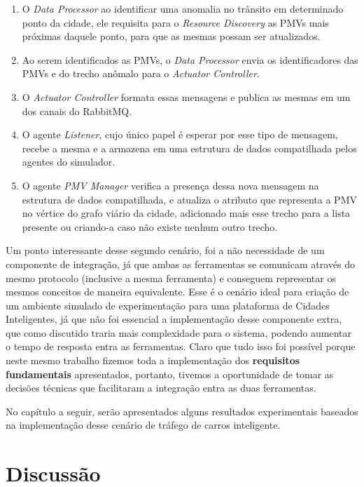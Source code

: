 \begin{enumerate}
    \item O \textit{Data Processor} ao identificar uma anomalia no trânsito em determinado ponto da cidade, ele requisita para o \textit{Resource Discovery} as PMVs mais próximas
        daquele ponto, para que as mesmas possam ser atualizados.

    \item Ao serem identificados as PMVs, o \textit{Data Processor} envia os identificadores das PMVs e do trecho anômalo para o \textit{Actuator Controller}.

    \item O \textit{Actuator Controller} formata essas mensagens e publica as mesmas em um dos canais do RabbitMQ.

    \item O agente \textit{Listener}, cujo único papel é esperar por esse tipo de mensagem, recebe a mesma e a armazena em uma estrutura de dados compatilhada pelos agentes do simulador.

    \item O agente \textit{PMV Manager} verifica a presença dessa nova mensagem na estrutura de dados compatilhada, e atualiza o atributo que representa a PMV no vértice do grafo
        viário da cidade, adicionado mais esse trecho para a lista presente ou criando-a caso não existe nenhum outro trecho.
\end{enumerate}

Um ponto interessante desse segundo cenário, foi a não necessidade de um componente de integração, já que ambas as ferramentas se comunicam através do mesmo protocolo (inclusive a
mesma ferramenta) e conseguem representar os mesmos conceitos de maneira equivalente.
Esse é o cenário ideal para criação de um ambiente simulado de experimentação para uma plataforma de Cidades Inteligentes, já que não foi essencial a implementação desse
componente extra, que como discutido traria mais complexidade para o sistema, podendo aumentar o tempo de resposta entra as ferramentas.
Claro que tudo isso foi possível porque neste mesmo trabalho fizemos toda a implementação dos \textbf{requisitos fundamentais} apresentados, portanto,
tivemos a oportunidade de tomar as decisões técnicas que facilitaram a integração entra as duas ferramentas.

No capítulo a seguir, serão apresentados alguns resultados experimentais baseados na implementação desse cenário de tráfego de carros inteligente.

\section{Discussão}

